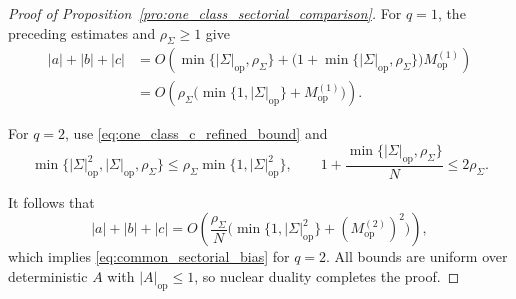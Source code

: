 \documentclass[EJP, preprint, NODS, nobera, nofontexpansion]{ejpecp}
\DeclareMathOperator{\op}{op}
\begin{document}
\begin{proof}[Proof of Proposition~\ref{pro:one_class_sectorial_comparison}]
For $q=1$, the preceding estimates and $\rho_\Sigma\geq1$ give
\begin{align*}
    |a|+|b|+|c|
    &=O\!\left(
        \min\{|\Sigma|_{\op},\rho_\Sigma\}
        +\bigl(1+\min\{|\Sigma|_{\op},\rho_\Sigma\}\bigr)
            M_{\op}^{(1)}
    \right)
    \\
    &=O\!\left(
        \rho_\Sigma
        \bigl(\min\{1,|\Sigma|_{\op}\}+M_{\op}^{(1)}\bigr)
    \right).
\end{align*}

For $q=2$, use \eqref{eq:one_class_c_refined_bound} and
\[
    \min\{|\Sigma|_{\op}^2,|\Sigma|_{\op},\rho_\Sigma\}
    \leq\rho_\Sigma\min\{1,|\Sigma|_{\op}^2\},
    \qquad
    1+\frac{\min\{|\Sigma|_{\op},\rho_\Sigma\}}N
    \leq2\rho_\Sigma.
\]

It follows that
\[
    |a|+|b|+|c|
    =O\!\left(
        \frac{\rho_\Sigma}{N}
        \bigl(\min\{1,|\Sigma|_{\op}^2\}+(M_{\op}^{(2)})^2\bigr)
    \right),
\]
which implies \eqref{eq:common_sectorial_bias} for $q=2$.
All bounds are uniform over deterministic $A$ with $|A|_{\op}\leq1$,
so nuclear duality completes the proof. 
\end{proof}
\end{document}
